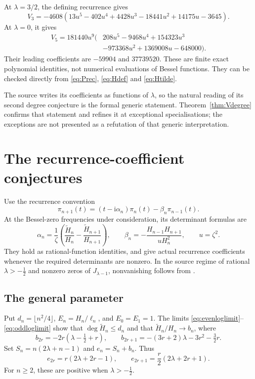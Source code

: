 \documentclass[11pt]{article}
\numberwithin{equation}{section}
\theoremstyle{remark}
\newcommand{\ii}{\mathrm{i}}
\newcommand{\wt}{\widetilde}
\begin{document}
At $\lambda=3/2$, the defining recurrence gives
\begin{equation}\label{eq:exception3}
 V_3=-4608(13u^5-402u^4+4428u^3-18441u^2+14175u-3645).
\end{equation}
At $\lambda=0$, it gives
\begin{equation}\label{eq:exception5}
 \begin{split}
 V_5=181440u^9(&208u^5-9468u^4+154323u^3\\
              &-973368u^2+1369008u-648000).
 \end{split}
\end{equation}
Their leading coefficients are $-59904$ and $37739520$.
These are finite exact polynomial identities, not numerical evaluations
of Bessel functions. They can be checked directly from
\eqref{eq:Prec}, \eqref{eq:Hdef} and \eqref{eq:Htilde}.

The source writes its coefficients as functions of $\lambda$, so the
natural reading of its second degree conjecture is the formal generic
statement. Theorem~\ref{thm:Vdegree} confirms that statement and refines
it at exceptional specialisations; the exceptions are not presented as
a refutation of that generic interpretation.

\section{The recurrence-coefficient conjectures}\label{sec:recurrence}

Use the recurrence convention
\[
 \pi_{n+1}(t)=(t-\ii\alpha_n)\pi_n(t)-\beta_n\pi_{n-1}(t).
\]
At the Bessel-zero frequencies under consideration, its determinant
formulas are
\begin{equation}\label{eq:abdet}
 \alpha_n=\frac1\zeta\left(\frac{\wt H_n}{H_n}
                           -\frac{\wt H_{n+1}}{H_{n+1}}\right),
 \qquad \beta_n=-\frac{H_{n-1}H_{n+1}}{uH_n^2},\qquad u=\zeta^2.
\end{equation}
They hold as rational-function identities, and give actual recurrence
coefficients whenever the required determinants are nonzero. In the
source regime of rational $\lambda>-\tfrac12$ and nonzero zeros of
$J_{\lambda-1}$, nonvanishing follows from
\cite[Theorem~2.2]{MCM2008}.

\subsection{The general parameter}

Put $d_n=\lfloor n^2/4\rfloor$, $E_n=H_n/\ell_n$, and $E_0=E_1=1$.
The limits \eqref{eq:evenloglimit}--\eqref{eq:oddloglimit} show that
$\deg\wt H_n\le d_n$ and that $\wt H_n/H_n\to b_n$, where
\[
 b_{2r}=-2r(\lambda-\tfrac12+r),\qquad
 b_{2r+1}=-(3r+2)\lambda-3r^2-\tfrac32r.
\]
Set $S_n=n(2\lambda+n-1)$ and $e_n=S_n+b_n$. Thus
\begin{equation}\label{eq:general-e}
 e_{2r}=r(2\lambda+2r-1),\qquad
 e_{2r+1}=\frac r2(2\lambda+2r+1).
\end{equation}
For $n\ge2$, these are positive when $\lambda>-\tfrac12$.
\end{document}
